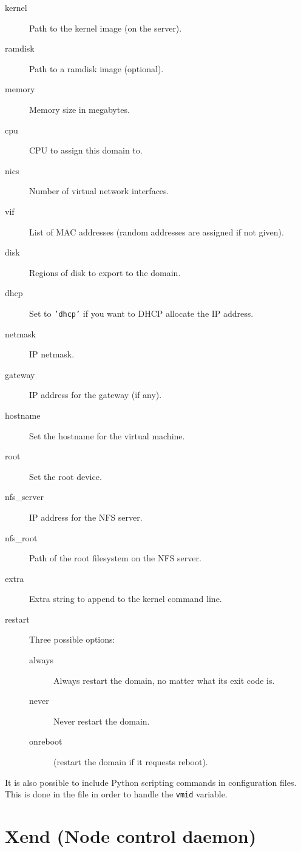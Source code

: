 \documentclass[11pt,twoside,final,openright]{xenstyle}
\begin{document}
\begin{description}
\item[kernel] Path to the kernel image (on the server).
\item[ramdisk] Path to a ramdisk image (optional).
\item[memory] Memory size in megabytes.
\item[cpu] CPU to assign this domain to.
\item[nics] Number of virtual network interfaces.
\item[vif] List of MAC addresses (random addresses are assigned if not given).
\item[disk] Regions of disk to export to the domain.
\item[dhcp] Set to {\tt 'dhcp'} if you want to DHCP allocate the IP address.
\item[netmask] IP netmask.
\item[gateway] IP address for the gateway (if any).
\item[hostname] Set the hostname for the virtual machine.
\item[root] Set the root device.
\item[nfs\_server] IP address for the NFS server.
\item[nfs\_root] Path of the root filesystem on the NFS server.
\item[extra] Extra string to append to the kernel command line.
\item[restart] Three possible options:
  \begin{description}
  \item[always] Always restart the domain, no matter what
                its exit code is.
  \item[never]  Never restart the domain.
  \item[onreboot] (restart the domain if it requests reboot).
  \end{description}
\end{description}

It is also possible to include Python scripting commands in
configuration files.  This is done in the  file in
order to handle the {\tt vmid} variable.


\chapter{Xend (Node control daemon)}
\label{cha:xend}
\end{document}
